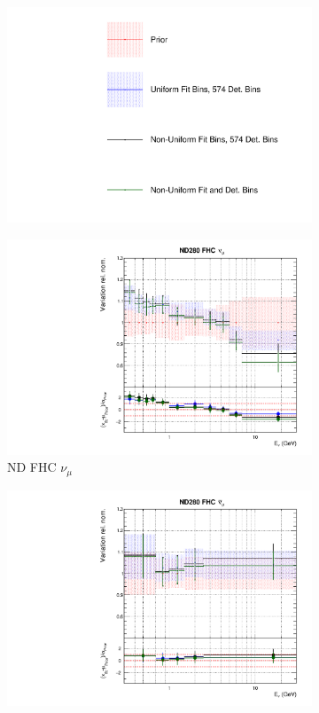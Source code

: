 \begin{figure}
\centering
\begin{subfigure}{0.95\textwidth}
  \centering
  \includegraphics[width=0.29\linewidth]{figs/polydata_leg}
\end{subfigure}
\begin{subfigure}{0.24\textwidth}
  \centering
  \includegraphics[width=0.95\linewidth]{figs/polydataflux_0}
  \caption{ND FHC $\nu_{\mu}$}
\end{subfigure}
\begin{subfigure}{0.24\textwidth}
  \centering
  \includegraphics[width=0.95\linewidth]{figs/polydataflux_1}

\end{subfigure}
\end{figure}
